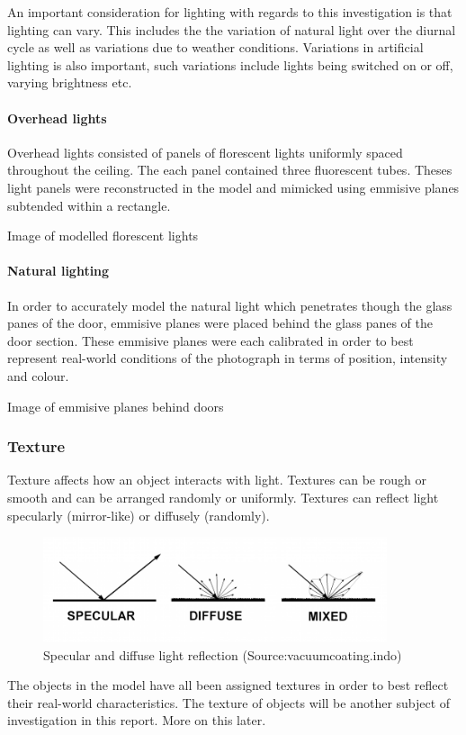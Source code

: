 \documentclass[11pt,a4paper]{report}
\begin{document}
				An important consideration for lighting with regards to this investigation is that lighting can vary. This includes the the variation of natural light over the diurnal cycle as well as variations due to weather conditions. Variations in artificial lighting is also important, such variations include lights being switched on or off, varying brightness etc.
				\paragraph{Overhead lights}
					Overhead lights consisted of panels of florescent lights uniformly spaced throughout the ceiling. The each panel contained three fluorescent tubes. Theses light panels were reconstructed in the model and mimicked using emmisive planes subtended within a rectangle.
					
					{{Image of modelled florescent lights}}
				
				\paragraph{Natural lighting}
					In order to accurately model the natural light which penetrates though the glass panes of the door, emmisive planes were placed behind the glass panes of the door section. These emmisive planes were each calibrated in order to best represent real-world conditions of the photograph in terms of position, intensity and colour.
					
					{{Image of emmisive planes behind doors}}
			\subsubsection{Texture}
				Texture affects how an object interacts with light. Textures can be rough or smooth and can be arranged randomly or uniformly. Textures can reflect light specularly (mirror-like) or diffusely (randomly).
				
				
				\begin{figure}[H]
					\centering
					\includegraphics[width=0.9\textwidth]{light_reflection}
					\caption{Specular and diffuse light reflection (Source:vacuumcoating.indo)}
					\label{fig:light_reflection}
				\end{figure}
				The objects in the model have all been assigned textures in order to best reflect their real-world characteristics. The texture of objects will be another subject of investigation in this report. More on this later.
				
\end{document}
